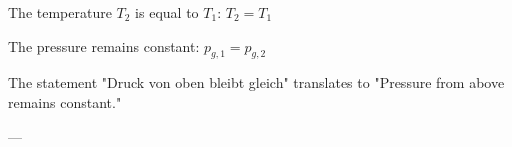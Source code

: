 The temperature \( T_2 \) is equal to \( T_1 \):  
\( T_2 = T_1 \)  

The pressure remains constant:  
\( p_{g,1} = p_{g,2} \)  

The statement "Druck von oben bleibt gleich" translates to "Pressure from above remains constant."  

---